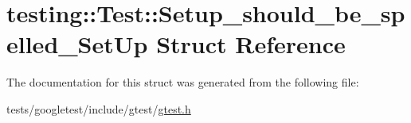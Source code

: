 \hypertarget{structtesting_1_1Test_1_1Setup__should__be__spelled__SetUp}{}\section{testing\+:\+:Test\+:\+:Setup\+\_\+should\+\_\+be\+\_\+spelled\+\_\+\+Set\+Up Struct Reference}
\label{structtesting_1_1Test_1_1Setup__should__be__spelled__SetUp}


The documentation for this struct was generated from the following file\+:\begin{DoxyCompactItemize}
\item 
tests/googletest/include/gtest/\hyperlink{gtest_8h}{gtest.\+h}\end{DoxyCompactItemize}
